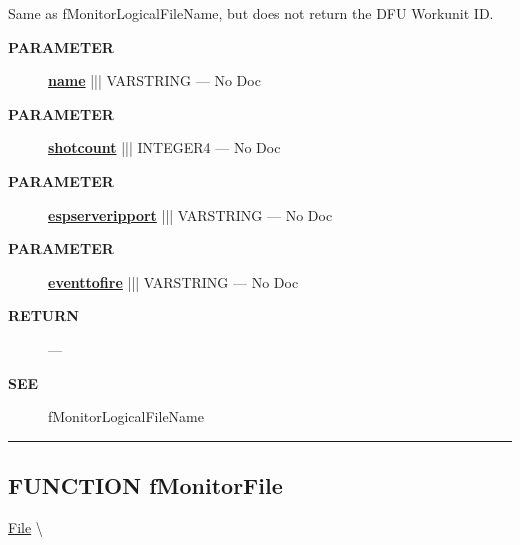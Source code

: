 \par





Same as fMonitorLogicalFileName, but does not return the DFU Workunit ID.






\par
\begin{description}
\item [\colorbox{tagtype}{\color{white} \textbf{\textsf{PARAMETER}}}] \textbf{\underline{name}} ||| VARSTRING --- No Doc
\item [\colorbox{tagtype}{\color{white} \textbf{\textsf{PARAMETER}}}] \textbf{\underline{shotcount}} ||| INTEGER4 --- No Doc
\item [\colorbox{tagtype}{\color{white} \textbf{\textsf{PARAMETER}}}] \textbf{\underline{espserveripport}} ||| VARSTRING --- No Doc
\item [\colorbox{tagtype}{\color{white} \textbf{\textsf{PARAMETER}}}] \textbf{\underline{eventtofire}} ||| VARSTRING --- No Doc
\end{description}







\par
\begin{description}
\item [\colorbox{tagtype}{\color{white} \textbf{\textsf{RETURN}}}] \textbf{} --- 
\end{description}






\par
\begin{description}
\item [\colorbox{tagtype}{\color{white} \textbf{\textsf{SEE}}}] fMonitorLogicalFileName
\end{description}




\rule{\linewidth}{0.5pt}
\subsection*{\textsf{\colorbox{headtoc}{\color{white} FUNCTION}
fMonitorFile}}

\hypertarget{ecldoc:file.fmonitorfile}{}
\hspace{0pt} \hyperlink{ecldoc:File}{File} \textbackslash 

